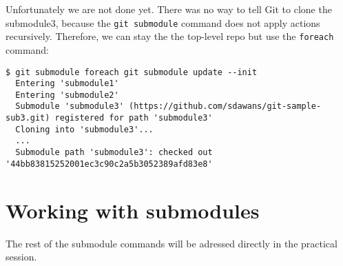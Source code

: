 \documentclass[a4paper]{../../common/tufte-latex/tufte-handout}
\begin{document}
Unfortunately we are not done yet. There was no way to tell Git to clone the submodule3, because the \texttt{git submodule} command does not apply actions recursively. Therefore, we can stay the the top-level repo but use the \texttt{foreach} command:

\begin{lstlisting}[style=BashInputStyle]
  $ git submodule foreach git submodule update --init
  Entering 'submodule1'
  Entering 'submodule2'
  Submodule 'submodule3' (https://github.com/sdawans/git-sample-sub3.git) registered for path 'submodule3'
  Cloning into 'submodule3'...
  ...
  Submodule path 'submodule3': checked out '44bb83815252001ec3c90c2a5b3052389afd83e8'
\end{lstlisting}

\section{Working with submodules}

The rest of the submodule commands will be adressed directly in the practical session.



\end{document}
